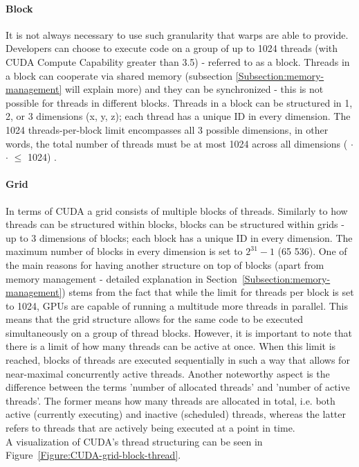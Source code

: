 \paragraph{Block}\label{Paragraph:CUDA-thread-management-block}
It is not always necessary to use such granularity that warps are able to provide. Developers can choose to execute code on a group of up to 1024 threads (with CUDA Compute Capability greater than 3.5) - referred to as a block. Threads in a block can cooperate via shared memory (subsection \ref{Subsection:memory-management} will explain more) and they can be synchronized - this is not possible for threads in different blocks. Threads in a block can be structured in 1, 2, or 3 dimensions (x, y, z); each thread has a unique ID in every dimension. The 1024 threads-per-block limit encompasses all 3 possible dimensions, in other words, the total number of threads must be at most 1024 across all dimensions ( $ \cdot $  $ \cdot $  $ \leq$ 1024) \cite{AbiChahla18June2008, NVIDIAMay2022}.

\paragraph{Grid}\label{Paragraph:CUDA-thread-management-grid}
In terms of CUDA a grid consists of multiple blocks of threads. Similarly to how threads can be structured within blocks, blocks can be structured within grids - up to 3 dimensions of blocks; each block has a unique ID in every dimension. The maximum number of blocks in every dimension is set to $ 2^{31} - 1 $ (65 536). One of the main reasons for having another structure on top of blocks (apart from memory management - detailed explanation in Section~\ref{Subsection:memory-management}) stems from the fact that while the limit for threads per block is set to 1024, GPUs are capable of running a multitude more threads in parallel. This means that the grid structure allows for the same code to be executed simultaneously on a group of thread blocks. However, it is important to note that there is a limit of how many threads can be active at once. When this limit is reached, blocks of threads are executed sequentially in such a way that allows for near-maximal concurrently active threads. Another noteworthy aspect is the difference between the terms 'number of allocated threads' and 'number of active threads'. The former means how many threads are allocated in total, i.e. both active (currently executing) and inactive (scheduled) threads, whereas the latter refers to threads that are actively being executed at a point in time. \\
A visualization of CUDA's thread structuring can be seen in Figure~\ref{Figure:CUDA-grid-block-thread}.

